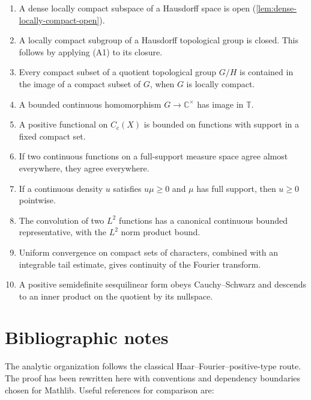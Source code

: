 \documentclass[11pt]{article}
\theoremstyle{definition}
\theoremstyle{remark}
\newcommand{\T}{\mathbb T}
\newcommand{\C}{\mathbb C}
\newcommand{\Cc}{C_{\mathrm c}}
\newcommand{\Lp}[1]{L^{#1}}
\newcommand{\mathlib}{\textsf{Mathlib}}
\begin{document}
\begin{enumerate}[label=(A\arabic*)]
\item A dense locally compact subspace of a Hausdorff space is open
(\cref{lem:dense-locally-compact-open}).
\item A locally compact subgroup of a Hausdorff topological group is closed.
This follows by applying (A1) to its closure.
\item Every compact subset of a quotient topological group $G/H$ is contained in the
image of a compact subset of $G$, when $G$ is locally compact.
\item A bounded continuous homomorphism $G\to\C^\times$ has image in $\T$.
\item A positive functional on $\Cc(X)$ is bounded on functions with support in a fixed
compact set.
\item If two continuous functions on a full-support measure space agree almost
everywhere, they agree everywhere.
\item If a continuous density $u$ satisfies $u\mu\geq0$ and $\mu$ has full support, then
$u\geq0$ pointwise.
\item The convolution of two $\Lp2$ functions has a canonical continuous bounded
representative, with the $\Lp2$ norm product bound.
\item Uniform convergence on compact sets of characters, combined with an integrable
tail estimate, gives continuity of the Fourier transform.
\item A positive semidefinite sesquilinear form obeys Cauchy--Schwarz and descends to an
inner product on the quotient by its nullspace.
\end{enumerate}

\section{Bibliographic notes}

The analytic organization follows the classical Haar--Fourier--positive-type route.  The
proof has been rewritten here with conventions and dependency boundaries chosen for
\mathlib.  Useful references for comparison are:
\end{document}
